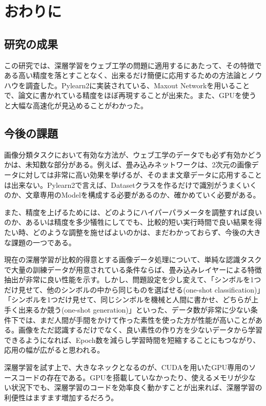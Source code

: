 \chapter{おわりに}
\section{研究の成果}
この研究では、深層学習をウェブ工学の問題に適用するにあたって、その特徴である高い精度を落とすことなく、出来るだけ簡便に応用するための方法論とノウハウを調査した。Pylearn2に実装されている、Maxout Networkを用いることで、論文に書かれている精度をほぼ再現することが出来た。また、GPUを使うと大幅な高速化が見込めることがわかった。

\section{今後の課題}
画像分類タスクにおいて有効な方法が、ウェブ工学のデータでも必ず有効かどうかは、未知数な部分がある。例えば、畳み込みネットワークは、2次元の画像データに対しては非常に高い効果を挙げるが、そのまま文章データに応用することは出来ない。Pylearn2で言えば、Datasetクラスを作るだけで識別がうまくいくのか、文章専用のModelを構成する必要があるのか、確かめていく必要がある。\par
また、精度を上げるためには、どのようにハイパーパラメータを調整すれば良いのか、あるいは精度を多少犠牲にしてでも、比較的短い実行時間で良い結果を得たい時、どのような調整を施せばよいのかは、まだわかっておらず、今後の大きな課題の一つである。\par
現在の深層学習が比較的得意とする画像データ処理について、単純な認識タスクで大量の訓練データが用意されている条件ならば、畳み込みレイヤーによる特徴抽出が非常に良い性能を示す。しかし、問題設定を少し変えて、「シンボルを1つだけ見せて、他のシンボルの中から同じものを選ばせる(one-shot classification)」「シンボルを1つだけ見せて、同じシンボルを機械と人間に書かせ、どちらが上手く出来るか競う(one-shot generation)」といった、データ数が非常に少ない条件下では、まだ人間が手間をかけて作った素性を使った方が性能が高いことがある\cite{lake2013one}。画像をただ認識するだけでなく、良い素性の作り方を少ないデータから学習できるようになれば、Epoch数を減らし学習時間を短縮することにもつながり、応用の幅が広がると思われる。\par
深層学習を試す上で、大きなネックとなるのが、CUDAを用いたGPU専用のソースコードの存在である。GPUを搭載していなかったり、使えるメモリが少ない状況下でも、深層学習のコードを効率良く動かすことが出来れば、深層学習の利便性はますます増加するだろう。\par
